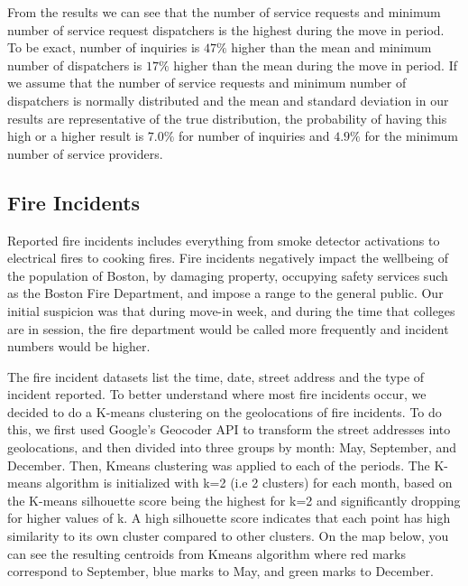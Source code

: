 \documentclass[journal, a4paper]{IEEEtran}
\begin{document}
\tab From the results we can see that the number of service requests and minimum
number of service request dispatchers is the highest during the move in period. To
be exact, number of inquiries is $47\%$ higher than the mean and minimum number of
dispatchers is $17\%$ higher than the mean during the move in period. If we assume
that the number of service requests and minimum number of dispatchers is
normally distributed and the mean and standard deviation in our results are
representative of the true distribution, the probability of having this high or a higher
result is $7.0\%$ for number of inquiries and $4.9\%$ for the minimum number of service
providers.

\subsection{Fire Incidents}
\tab 
Reported fire incidents includes everything from smoke detector activations to electrical fires to cooking fires. Fire incidents negatively impact the wellbeing of the population of Boston, by damaging property, occupying safety services such as the Boston Fire Department, and impose a range to the general public. Our initial suspicion was that during move-in week, and during the time that colleges are in session, the fire department would be called more frequently and incident numbers would be higher. 
\tab

The fire incident datasets list the time, date, street address and the type of incident reported.  To better understand where most fire incidents occur, we decided to do a K-means clustering on the geolocations of fire incidents. To do this, we first used Google’s Geocoder API to transform the street addresses into geolocations, and then divided into three groups by month: May, September, and December. Then, K\-means clustering was applied to each of the periods. The K-means algorithm is initialized with k=2 (i.e 2 clusters) for each month, based on the K-means silhouette score being the highest for k=2 and significantly dropping for higher values of k. A high silhouette score indicates that each point has high similarity to its own cluster compared to other clusters. On the map below, you can see the resulting centroids from K\-means algorithm where red marks correspond to September, blue marks to May, and green marks to December.
\newline
\end{document}
